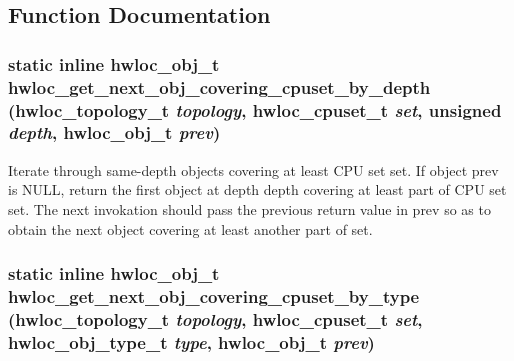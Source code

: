 \subsection{Function Documentation}
\hypertarget{group__hwlocality__helper__find__coverings_ga39cbd3f1608d0fe503d396430cffe219}{
\subsubsection[{hwloc\_\-get\_\-next\_\-obj\_\-covering\_\-cpuset\_\-by\_\-depth}]{\setlength{\rightskip}{0pt plus 5cm}static inline {\bf hwloc\_\-obj\_\-t} hwloc\_\-get\_\-next\_\-obj\_\-covering\_\-cpuset\_\-by\_\-depth ({\bf hwloc\_\-topology\_\-t} {\em topology}, \/  {\bf hwloc\_\-cpuset\_\-t} {\em set}, \/  unsigned {\em depth}, \/  {\bf hwloc\_\-obj\_\-t} {\em prev})}}
\label{group__hwlocality__helper__find__coverings_ga39cbd3f1608d0fe503d396430cffe219}


Iterate through same-\/depth objects covering at least CPU set {\ttfamily set}. If object {\ttfamily prev} is {\ttfamily NULL}, return the first object at depth {\ttfamily depth} covering at least part of CPU set {\ttfamily set}. The next invokation should pass the previous return value in {\ttfamily prev} so as to obtain the next object covering at least another part of {\ttfamily set}. \hypertarget{group__hwlocality__helper__find__coverings_gaad89905a7c9388283535296802d766cb}{
\subsubsection[{hwloc\_\-get\_\-next\_\-obj\_\-covering\_\-cpuset\_\-by\_\-type}]{\setlength{\rightskip}{0pt plus 5cm}static inline {\bf hwloc\_\-obj\_\-t} hwloc\_\-get\_\-next\_\-obj\_\-covering\_\-cpuset\_\-by\_\-type ({\bf hwloc\_\-topology\_\-t} {\em topology}, \/  {\bf hwloc\_\-cpuset\_\-t} {\em set}, \/  {\bf hwloc\_\-obj\_\-type\_\-t} {\em type}, \/  {\bf hwloc\_\-obj\_\-t} {\em prev})}}
\label{group__hwlocality__helper__find__coverings_gaad89905a7c9388283535296802d766cb}


